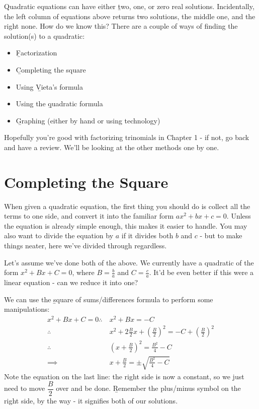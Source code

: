 Quadratic equations can have either \b{two, one, or zero real solutions}. Incidentally, the left column of equations above returns two solutions, the middle one, and the right none. How do we know this?
\newpage
There are a couple of ways of finding the solution(s) to a quadratic:
\begin{itemize}
    \item \b{Factorization}
    \item \b{Completing the square}
    \item Using \b{Vieta's formula}
    \item Using the \b{quadratic formula}
    \item \b{Graphing} (either by hand or using technology)
\end{itemize}

Hopefully you're good with factorizing trinomials in Chapter 1 - if not, go back and have a review. We'll be looking at the other methods one by one.

\section{Completing the Square}
When given a quadratic equation, the first thing you should do is collect all the terms to one side, and convert it into the familiar form $ax^2+bx+c=0$. Unless the equation is already simple enough, this makes it easier to handle. You may also want to divide the equation by $a$ if it divides both $b$ and $c$ - but to make things neater, here we've divided through regardless.

Let's assume we've done both of the above. We currently have a quadratic of the form $x^2+Bx+C=0$, where $B=\frac{b}{a}$ and $C=\frac{c}{a}$. It'd be even better if this were a linear equation - can we reduce it into one?

We can use the \b{square of sums/differences} formula to perform some manipulations:
\begin{align}
    x^2+Bx+C=0\therefore\ &x^2+Bx=-C \\
    \therefore\ &x^2+2\frac{B}2x+\left(\frac{B}{2}\right)^2=-C+\left(\frac{B}{2}\right)^2 \\
    \therefore\ &\left(x+\frac{B}{2}\right)^2=\frac{B^2}{4}-C \\
    \implies&x+\frac{B}{2}=\pm\sqrt{\frac{B^2}{4}-C}
\end{align}
Note the equation on the last line: the right side is now a constant, so we just need to move $\dfrac B2$ over and be done. \b{Remember the plus/minus symbol on the right side, by the way} - it signifies both of our solutions.

